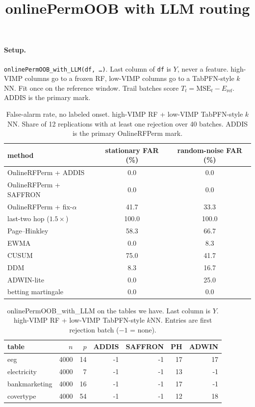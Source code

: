 \documentclass[11pt]{article}
\title{onlinePermOOB with LLM routing}
\author{}
\date{}
\begin{document}
\maketitle
\thispagestyle{empty}

\paragraph{Setup.}
\texttt{onlinePermOOB\_with\_LLM(df, \ldots)}. Last column of \texttt{df} is $Y$, never a feature.
high-VIMP columns go to a frozen RF, low-VIMP columns go to a TabPFN-style $k$NN.
Fit once on the reference window. Trail batches score $T_t=\mathrm{MSE}_t-E_{\mathrm{ref}}$.
ADDIS is the primary mark.

\begin{table}[ht]
\centering
\caption{False-alarm rate, no labeled onset. high-VIMP RF + low-VIMP TabPFN-style $k$NN. Share of 12 replications with at least one rejection over 40 batches. ADDIS is the primary OnlineRFPerm mark.}
\label{tab:far}
\begin{tabular}{lcc}
\toprule
method & stationary FAR (\%) & random-noise FAR (\%) \\
\midrule
OnlineRFPerm + ADDIS & 0.0 & 0.0 \\
OnlineRFPerm + SAFFRON & 0.0 & 0.0 \\
OnlineRFPerm + fix-$\alpha$ & 41.7 & 33.3 \\
last-two hop ($1.5\times$) & 100.0 & 100.0 \\
Page--Hinkley & 58.3 & 66.7 \\
EWMA & 0.0 & 8.3 \\
CUSUM & 75.0 & 41.7 \\
DDM & 8.3 & 16.7 \\
ADWIN-lite & 0.0 & 25.0 \\
betting martingale & 0.0 & 0.0 \\
\bottomrule
\end{tabular}
\end{table}

\begin{table}[ht]
\centering
\caption{onlinePermOOB\_with\_LLM on the tables we have. Last column is $Y$. high-VIMP RF + low-VIMP TabPFN-style $k$NN. Entries are first rejection batch ($-1$ = none).}
\label{tab:data}
\begin{tabular}{lrrrrrr}
\toprule
table & $n$ & $p$ & ADDIS & SAFFRON & PH & ADWIN \\
\midrule
eeg & 4000 & 14 & -1 & -1 & 17 & 17 \\
electricity & 4000 & 7 & -1 & -1 & 13 & -1 \\
bankmarketing & 4000 & 16 & -1 & -1 & 17 & -1 \\
covertype & 4000 & 54 & -1 & -1 & 12 & 18 \\
\bottomrule
\end{tabular}
\end{table}
\end{document}
